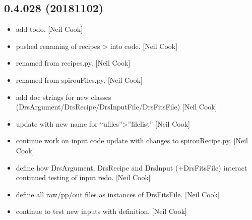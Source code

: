 \documentclass[a4paper,10pt,english]{report}
\begin{document}
\subsection{0.4.028 (2018\sphinxhyphen{}11\sphinxhyphen{}02)}
\label{\detokenize{misc/changelog:id290}}\begin{itemize}
\item {} 
 \sphinxhyphen{} add todo. {[}Neil Cook{]}

\item {} 
 \sphinxhyphen{} pushed renaming of recipes \textendash{}\textgreater{}  into
code. {[}Neil Cook{]}

\item {} 
 \sphinxhyphen{} renamed from recipes.py. {[}Neil Cook{]}

\item {} 
 \sphinxhyphen{} renamed from spirouFiles.py. {[}Neil Cook{]}

\item {} 
 \sphinxhyphen{} add doc strings for new classes
(DrsArgument/DrsRecipe/DrsInputFile/DrsFitsFile) {[}Neil Cook{]}

\item {} 
 \sphinxhyphen{} update with new name for “ufiles”\textendash{}\textgreater{}”filelist” {[}Neil
Cook{]}

\item {} 
 \sphinxhyphen{} continue work on input code \sphinxhyphen{} update with changes
to spirouRecipe.py. {[}Neil Cook{]}

\item {} 
 \sphinxhyphen{} define how DrsArgument, DrsRecipe and DrsInput
(+DrsFitsFile) interact \sphinxhyphen{} continued testing of input redo. {[}Neil Cook{]}

\item {} 
 \sphinxhyphen{} define all raw/pp/out files as instances of
DrsFitsFile. {[}Neil Cook{]}

\item {} 
 \sphinxhyphen{} continue to test new inputs with  definition.
{[}Neil Cook{]}

\end{itemize}
\end{document}
